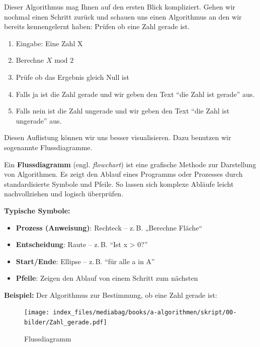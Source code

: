 \documentclass[
  letterpaper,
  DIV=11,
  numbers=noendperiod]{scrreprt}
\providecommand{\tightlist}{%
  \setlength{\itemsep}{0pt}\setlength{\parskip}{0pt}}\usepackage{longtable,booktabs,array}
\begin{document}
Dieser Algorithmus mag Ihnen auf den ersten Blick kompliziert. Gehen wir
nochmal einen Schritt zurück und schauen uns einen Algorithmus an den
wir bereits kennengelernt haben: Prüfen ob eine Zahl gerade ist.

\begin{enumerate}
\def\labelenumi{\arabic{enumi}.}
\tightlist
\item
  Eingabe: Eine Zahl X
\item
  Berechne \(X\text{ mod }2\)
\item
  Prüfe ob das Ergebnis gleich Null ist
\item
  Falls ja ist die Zahl gerade und wir geben den Text ``die Zahl ist
  gerade'' aus.
\item
  Falls nein ist die Zahl ungerade und wir geben den Text ``die Zahl ist
  ungerade'' aus.
\end{enumerate}

Diesen Auflistung können wir uns besser visualisieren. Dazu benutzen wir
sogenannte Flussdiagramme.

\begin{tcolorbox}[enhanced jigsaw, bottomtitle=1mm, colbacktitle=quarto-callout-note-color!10!white, colback=white, opacityback=0, arc=.35mm, left=2mm, toprule=.15mm, title=\textcolor{quarto-callout-note-color}{\faInfo}\hspace{0.5em}{Flussdiagramme - Visuelle Darstellung von Abläufen}, coltitle=black, toptitle=1mm, leftrule=.75mm, opacitybacktitle=0.6, breakable, titlerule=0mm, rightrule=.15mm, bottomrule=.15mm, colframe=quarto-callout-note-color-frame]

Ein \textbf{Flussdiagramm} (engl. \emph{flowchart}) ist eine grafische
Methode zur Darstellung von Algorithmen. Es zeigt den Ablauf eines
Programms oder Prozesses durch standardisierte Symbole und Pfeile. So
lassen sich komplexe Abläufe leicht nachvollziehen und logisch
überprüfen.

\textbf{Typische Symbole:}

\begin{itemize}
\tightlist
\item
  \textbf{Prozess (Anweisung)}: Rechteck -- z.\,B. „Berechne Fläche``
\item
  \textbf{Entscheidung}: Raute -- z.\,B. ``Ist x \textgreater{} 0?''
\item
  \textbf{Start/Ende}: Ellipse -- z.\,B. ``für alle a in A''
\item
  \textbf{Pfeile}: Zeigen den Ablauf von einem Schritt zum nächsten
\end{itemize}

\textbf{Beispiel:} Der Algorithmus zur Bestimmung, ob eine Zahl gerade
ist:

\begin{figure}[H]

{\centering \texttt{[image: index\_files/mediabag/books/a-algorithmen/skript/00-bilder/Zahl\_gerade.pdf]}

}

\caption{Flussdiagramm}

\end{figure}%

\end{tcolorbox}
\end{document}
